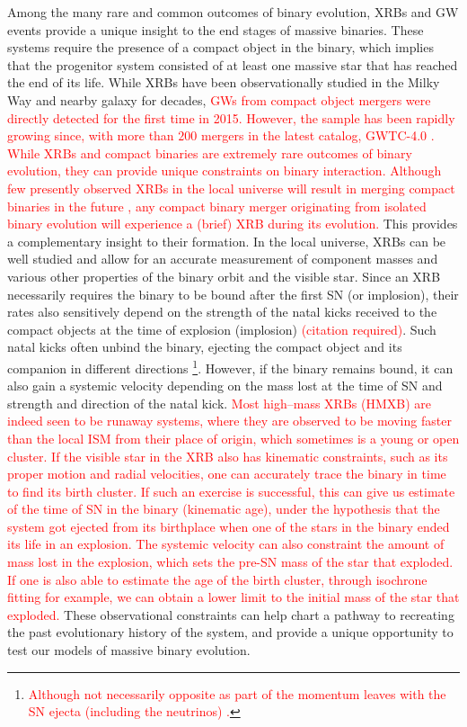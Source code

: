 \documentclass[linenumbers,trackchanges,twocolumn]{aastex701}
\newcommand{\red}{\textcolor{red}}
\begin{document}
Among the many rare and common outcomes of binary evolution, XRBs and GW events provide a unique insight to the end stages of massive binaries. These systems require the presence of a compact object in the binary, which implies that the progenitor system consisted of at least one massive star that has reached the end of its life. While XRBs have been observationally studied in the Milky Way and nearby galaxy for decades, \red{GWs from compact object mergers were directly detected for the first time in 2015. However, the sample has been rapidly growing since, with more than $200$ mergers in the latest catalog, GWTC-4.0 \citep{2025arXiv250818082T,2025arXiv250818083T}. While XRBs and compact binaries are extremely rare outcomes of binary evolution, they can provide unique constraints on binary interaction. Although few presently observed XRBs in the local universe will result in merging compact binaries in the future \citep{2006ARA&A..44...49R, 2022ApJ...929L..26F}, any compact binary merger originating from isolated binary evolution will experience a (brief) XRB during its evolution.} This provides a complementary insight to their formation. In the local universe, XRBs can be well studied and allow for an accurate measurement of component masses and various other properties of the binary orbit and the visible star. Since an XRB necessarily requires the binary to be bound after the first SN (or implosion), their rates also sensitively depend on the strength of the natal kicks received to the compact objects at the time of explosion (implosion) \red{(citation required)}. Such natal kicks often unbind the binary, ejecting the compact object and its companion in different directions \footnote{\red{Although not necessarily opposite as part of the momentum leaves with the SN ejecta (including the neutrinos) \citep{2020MNRAS.498..899N, 2012ARNPS..62..407J, 2017ApJ...837...84J}.}}. However, if the binary remains bound, it can also gain a systemic velocity depending on the mass lost at the time of SN and strength and direction of the natal kick. \red{Most high--mass XRBs (HMXB) are indeed seen to be runaway systems, where they are observed to be moving faster than the local ISM from their place of origin, which sometimes is a young or open cluster. If the visible star in the XRB also has kinematic constraints, such as its proper motion and radial velocities, one can accurately trace the binary in time to find its birth cluster. If such an exercise is successful, this can give us estimate of the time of SN in the binary (kinematic age), under the hypothesis that the system got ejected from its birthplace when one of the stars in the binary ended its life in an explosion. The systemic velocity can also constraint the amount of mass lost in the explosion, which sets the pre-SN mass of the star that exploded. If one is also able to estimate the age of the birth cluster, through isochrone fitting for example, we can obtain a lower limit to the initial mass of the star that exploded.} These observational constraints can help chart a pathway to recreating the past evolutionary history of the system, and provide a unique opportunity to test our models of massive binary evolution.  
\end{document}
